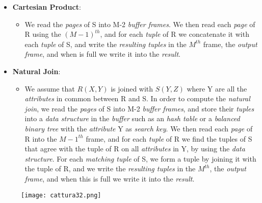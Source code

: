 \documentclass{article}
\begin{document}
\begin{itemize}
\begin{itemize}
\end{itemize}
\item \textbf{Cartesian Product}:
\begin{itemize}
\item We read the \emph{pages} of S into M-2 \emph{buffer frames}. We then read each \emph{page} of R using the $(M-1)^{th}$, and for each \emph{tuple} of R we concatenate it with each \emph{tuple} of S, and write the \emph{resulting tuples} in the $M^{th}$ frame, the \emph{output frame}, and when is full we write it into the \emph{result}.
\end{itemize}
\item \textbf{Natural Join}:
\begin{itemize}
\item We assume that $R(X,Y)$ is joined with $S(Y,Z)$ where Y are all the \emph{attributes} in common between R and S. In order to compute the \emph{natural join}, we read the \emph{pages} of S into M-2 \emph{buffer frames}, and store their \emph{tuples} into a \emph{data structure} in the \emph{buffer} such as an \emph{hash table} or a \emph{balanced binary tree} with the \emph{attribute} Y as \emph{search key}. We then read each \emph{page} of R into the $M-1^{th}$ frame, and for each \emph{tuple} of R we find the tuples of S that agree with the tuple of R on all \emph{attributes} in Y, by using the \emph{data structure}. For each \emph{matching tuple} of S, we form a tuple by joining it with the tuple of R, and we write the \emph{resulting tuples} in the $M^{th}$, the \emph{output frame}, and when this is full we write it into the \emph{result}. 
\end{itemize}
\end{itemize}
\begin{figure}[H]
  \centering
  \texttt{[image: cattura32.png]}
\end{figure}
\end{document}
